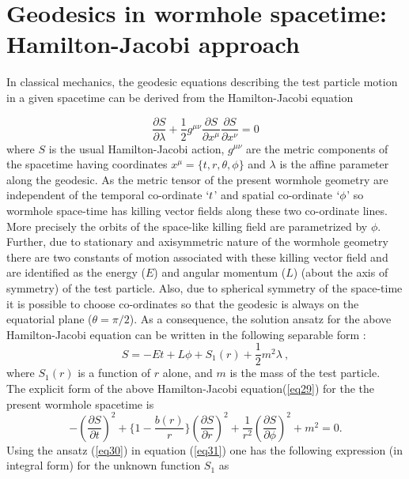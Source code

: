 \documentclass[10pt]{revtex4}
\begin{document}
 \section{ Geodesics in wormhole spacetime: Hamilton-Jacobi approach}\label{sec:iv}
 In classical mechanics, the geodesic equations describing the test particle motion in a given spacetime can be derived from the Hamilton-Jacobi equation \cite{r25}
  
 \begin{equation}\label{eq29}
 \frac{\partial S}{\partial \lambda}+\frac{1}{2}g^{\mu\nu}\frac{\partial S}{\partial x^\mu}\frac{\partial S}{\partial x^\nu}=0
 \end{equation} where $S$ is the usual Hamilton-Jacobi action, $g^{\mu\nu}$ are the metric components of the spacetime having coordinates $x^\mu=\{t,r,\theta,\phi\}$ and $\lambda$ is the affine parameter along the geodesic. As the metric tensor of the present wormhole geometry are independent of the temporal co-ordinate $`t$' and spatial co-ordinate $`\phi$' so wormhole space-time has killing vector fields along these two co-ordinate lines. More precisely the orbits of the space-like killing field are parametrized by $\phi$. Further, due to stationary and axisymmetric nature of the wormhole geometry there are two constants of motion associated with these killing vector field and are identified as the energy ($E$) and angular momentum ($L$) (about the axis of symmetry) of the test particle. Also, due to spherical symmetry of the space-time it is possible to choose co-ordinates so that the geodesic is always on the equatorial plane ($\theta=\pi/2$). As a consequence, the solution ansatz for the above Hamilton-Jacobi equation can be written in the following separable form \cite{r19}:
  \begin{equation}\label{eq30}
 S=-Et+L\phi+S_1(r)+\frac{1}{2}m^2\lambda ~,
 \end{equation}
  where $S_1(r)$ is a function of $r$ alone, and $m$ is the mass of the test particle.\\
 The explicit form of the above Hamilton-Jacobi equation(\ref{eq29}) for the the present wormhole spacetime is
  \begin{equation}\label{eq31}
 -\left(\frac{\partial S}{\partial t}\right)^2+\Bigg\{1-\frac{b(r)}{r}\Bigg\}\left(\frac{\partial S}{\partial r}\right)^2+\frac{1}{r^2}\left(\frac{\partial S}{\partial \phi}\right)^2+m^2=0.
 \end{equation}
 Using the ansatz (\ref{eq30}) in equation (\ref{eq31}) one has the following expression (in integral form) for the unknown function $S_1$ as %
\end{document}
